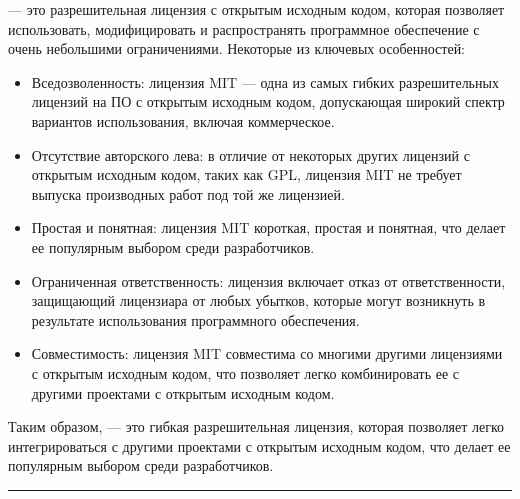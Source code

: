 \documentclass[letterpaper,10pt,russian]{sphinxmanual}
\begin{document}
\sphinxAtStartPar
{} — это разрешительная лицензия с открытым исходным кодом, которая позволяет использовать, модифицировать и распространять программное обеспечение с очень небольшими ограничениями. Некоторые из ключевых особенностей:
\begin{itemize}
\item {} 
\sphinxAtStartPar
Вседозволенность: лицензия MIT — одна из самых гибких разрешительных лицензий на ПО с открытым исходным кодом, допускающая широкий спектр вариантов использования, включая коммерческое.

\item {} 
\sphinxAtStartPar
Отсутствие авторского лева: в отличие от некоторых других лицензий с открытым исходным кодом, таких как GPL, лицензия MIT не требует выпуска производных работ под той же лицензией.

\item {} 
\sphinxAtStartPar
Простая и понятная: лицензия MIT короткая, простая и понятная, что делает ее популярным выбором среди разработчиков.

\item {} 
\sphinxAtStartPar
Ограниченная ответственность: лицензия включает отказ от ответственности, защищающий лицензиара от любых убытков, которые могут возникнуть в результате использования программного обеспечения.

\item {} 
\sphinxAtStartPar
Совместимость: лицензия MIT совместима со многими другими лицензиями с открытым исходным кодом, что позволяет легко комбинировать ее с другими проектами с открытым исходным кодом.

\end{itemize}

\sphinxAtStartPar
Таким образом,  — это гибкая разрешительная лицензия, которая позволяет легко интегрироваться с другими проектами с открытым исходным кодом, что делает ее популярным выбором среди разработчиков.


\bigskip\hrule\bigskip
\end{document}
